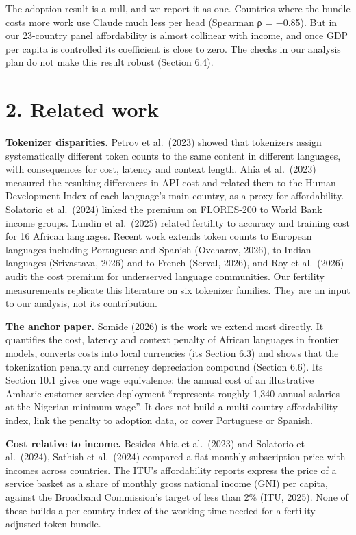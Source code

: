 \documentclass[11pt]{article}
\begin{document}
The adoption result is a null, and we report it as one. Countries where the bundle costs more work use Claude much less per head (Spearman ρ = −0.85). But in our 23-country panel affordability is almost collinear with income, and once GDP per capita is controlled its coefficient is close to zero. The checks in our analysis plan do not make this result robust (Section 6.4).

\section{2. Related work}

\textbf{Tokenizer disparities.} Petrov et al.~(2023) showed that tokenizers assign systematically different token counts to the same content in different languages, with consequences for cost, latency and context length. Ahia et al.~(2023) measured the resulting differences in API cost and related them to the Human Development Index of each language's main country, as a proxy for affordability. Solatorio et al.~(2024) linked the premium on FLORES-200 to World Bank income groups. Lundin et al.~(2025) related fertility to accuracy and training cost for 16 African languages. Recent work extends token counts to European languages including Portuguese and Spanish (Ovcharov, 2026), to Indian languages (Srivastava, 2026) and to French (Serval, 2026), and Roy et al.~(2026) audit the cost premium for underserved language communities. Our fertility measurements replicate this literature on six tokenizer families. They are an input to our analysis, not its contribution.

\textbf{The anchor paper.} Somide (2026) is the work we extend most directly. It quantifies the cost, latency and context penalty of African languages in frontier models, converts costs into local currencies (its Section 6.3) and shows that the tokenization penalty and currency depreciation compound (Section 6.6). Its Section 10.1 gives one wage equivalence: the annual cost of an illustrative Amharic customer-service deployment ``represents roughly 1,340 annual salaries at the Nigerian minimum wage''. It does not build a multi-country affordability index, link the penalty to adoption data, or cover Portuguese or Spanish.

\textbf{Cost relative to income.} Besides Ahia et al.~(2023) and Solatorio et al.~(2024), Sathish et al.~(2024) compared a flat monthly subscription price with incomes across countries. The ITU's affordability reports express the price of a service basket as a share of monthly gross national income (GNI) per capita, against the Broadband Commission's target of less than 2\% (ITU, 2025). None of these builds a per-country index of the working time needed for a fertility-adjusted token bundle.
\end{document}
